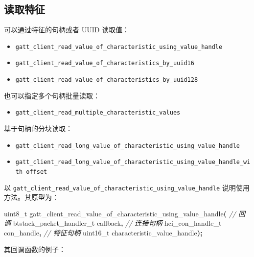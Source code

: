 \documentclass[
  12pt,
]{book}
\newenvironment{Shaded}{\begin{snugshade}}{\end{snugshade}}
\newcommand{\CommentTok}[1]{\textcolor[rgb]{0.56,0.35,0.01}{\textit{#1}}}
\newcommand{\DataTypeTok}[1]{\textcolor[rgb]{0.13,0.29,0.53}{#1}}
\newcommand{\NormalTok}[1]{#1}
\newcommand{\OperatorTok}[1]{\textcolor[rgb]{0.81,0.36,0.00}{\textbf{#1}}}
\providecommand{\tightlist}{%
  \setlength{\itemsep}{0pt}\setlength{\parskip}{0pt}}
\begin{document}
\hypertarget{ux8bfbux53d6ux7279ux5f81}{%
\subsection{读取特征}\label{ux8bfbux53d6ux7279ux5f81}}

可以通过特征的句柄或者 UUID 读取值：

\begin{itemize}
\tightlist
\item
  \texttt{gatt\_client\_read\_value\_of\_characteristic\_using\_value\_handle}
\item
  \texttt{gatt\_client\_read\_value\_of\_characteristics\_by\_uuid16}
\item
  \texttt{gatt\_client\_read\_value\_of\_characteristics\_by\_uuid128}
\end{itemize}

也可以指定多个句柄批量读取：

\begin{itemize}
\tightlist
\item
  \texttt{gatt\_client\_read\_multiple\_characteristic\_values}
\end{itemize}

基于句柄的分块读取：

\begin{itemize}
\tightlist
\item
  \texttt{gatt\_client\_read\_long\_value\_of\_characteristic\_using\_value\_handle}
\item
  \texttt{gatt\_client\_read\_long\_value\_of\_characteristic\_using\_value\_handle\_with\_offset}
\end{itemize}

以 \texttt{gatt\_client\_read\_value\_of\_characteristic\_using\_value\_handle} 说明使用方法。其原型为：

\begin{Shaded}
\begin{Highlighting}[]
\DataTypeTok{uint8\_t}\NormalTok{ gatt\_client\_read\_value\_of\_characteristic\_using\_value\_handle}\OperatorTok{(}
  \CommentTok{// 回调}
\NormalTok{  btstack\_packet\_handler\_t callback}\OperatorTok{,}
  \CommentTok{// 连接句柄}
\NormalTok{  hci\_con\_handle\_t con\_handle}\OperatorTok{,}
  \CommentTok{// 特征句柄}
  \DataTypeTok{uint16\_t}\NormalTok{ characteristic\_value\_handle}\OperatorTok{);}
\end{Highlighting}
\end{Shaded}

其回调函数的例子：
\end{document}
